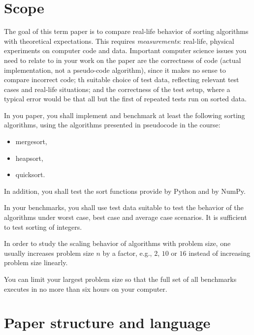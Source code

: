 \documentclass[sigconf, nonacm, natbib, screen, balance=False]{acmart}
\begin{document}
\section{Scope}\label{sec:scope}

The goal of this term paper is to compare real-life behavior of
sorting algorithms with theoretical expectations.  This requires
\emph{measurements}: real-life, physical experiments on computer code
and data.  Important computer science issues you need to relate to in
your work on the paper are the correctness of code (actual
implementation, not a pseudo-code algorithm), since it makes no sense
to compare incorrect code; th suitable choice of test data, reflecting
relevant test cases and real-life situations; and the correctness of
the test setup, where a typical error would be that all but the first
of repeated tests run on sorted data.

In you paper, you shall implement and benchmark at least the following
sorting algorithms, using the algorithms presented in pseudocode in
the course:
\begin{itemize}
\item mergesort,
\item heapsort,
  \item quicksort.
\end{itemize}
In addition, you shall test the sort functions provide by Python and
by NumPy.

In your benchmarks, you shall use test data suitable to test the
behavior of the algorithms under worst case, best case and average
case scenarios. It is sufficient to test sorting of integers.

In order to study the scaling behavior of algorithms with problem
size, one usually increases problem size $n$ by a factor, e.g., $2$,
$10$ or $16$ instead of increasing problem size linearly.

You can limit your largest problem size so that the full set of all
benchmarks executes in no more than six hours on your computer.


\section{Paper structure and language}\label{sec:structure}
\end{document}
